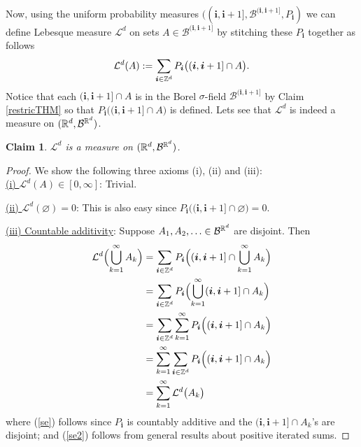 \documentclass[10pt,letterpaper,twocolumn]{article}
\newtheorem{claim}{Claim}
\newcommand{\bs}{\boldsymbol}
\begin{document}
Now, using the uniform probability measures $((\bs i, \bs i +1],\mathcal B^{(\bs i,\bs i+1] }, P_{\bs i})$ we can define Lebesque measure $\mathcal L^d$ on sets $A\in\mathcal B^{(\bs i,\bs i+1] }$ by stitching these $P_{\bs i}$ together as follows
\begin{equation}
\label{Lm}
 \mathcal L^d(A):= \sum_{\bs i\in\Bbb Z^d} P_{\bs i}\bigl( (\bs i, \bs i+1]\cap A\bigr).
 \end{equation}
Notice that each $ (\bs i, \bs i+1]\cap A$ is in the Borel $\sigma$-field $\mathcal B^{(\bs i,\bs i+1] }$ by Claim \ref{restricTHM} so that
$P_{\bs i}\bigl( (\bs i, \bs i+1]\cap A\bigr)$ is defined.
Lets see that $\mathcal L^d$ is indeed a measure on $(\Bbb R^d,\mathcal B^{\Bbb R^d })$.
\begin{claim}
 $\mathcal L^d$  is a measure on $(\Bbb R^d,\mathcal B^{\Bbb R^d })$.
\end{claim}
\begin{proof}
We show the following three axioms (i), (ii) and (iii):\\
\noindent
\underline{(i)  $\mathcal L^d(A)\in [0,\infty]$}: Trivial.


  \vspace{.2cm}
\noindent
\underline{(ii)  $\mathcal L^d(\varnothing)=0$}: This is also easy since $P_{\bs i}\bigl( (\bs i, \bs i+1]\cap \varnothing\bigr)=0$.


  \vspace{.2cm}
\noindent
\underline{(iii) Countable additivity}: Suppose $A_1,A_2,\ldots\in\mathcal B^{\Bbb R^d }$ are disjoint. Then
\begin{align}
\mathcal L^d\Bigl (\bigcup_{k=1}^\infty A_k\Bigr)&=\sum_{\bs i\in\Bbb Z^d} P_{\bs i}\Bigl((\bs i, \bs i+1] \cap \bigcup_{k=1}^\infty A_k \Bigr) \nonumber\\
&=\sum_{\bs i\in\Bbb Z^d} P_{\bs i}\Bigl( \bigcup_{k=1}^\infty (\bs i, \bs i+1] \cap A_k \Bigr) \nonumber\\
&=\sum_{\bs i\in\Bbb Z^d} \sum_{k=1}^\infty P_{\bs i} \Bigl((\bs i, \bs i+1] \cap A_k \Bigr)\label{se} \\
&=\sum_{k=1}^\infty  \sum_{\bs i\in\Bbb Z^d} P_{\bs i} \Bigl((\bs i, \bs i+1] \cap A_k \Bigr)\label{se2} \\
&=\sum_{k=1}^\infty  \mathcal L^d\bigl (A_k \bigr) \nonumber
\end{align}
where (\ref{se}) follows since $P_{\bs i}$ is countably additive and the $ (\bs i, \bs i+1]\cap A_k $'s are disjoint; and (\ref{se2}) follows from general results about positive iterated sums.
\end{proof}
\end{document}
